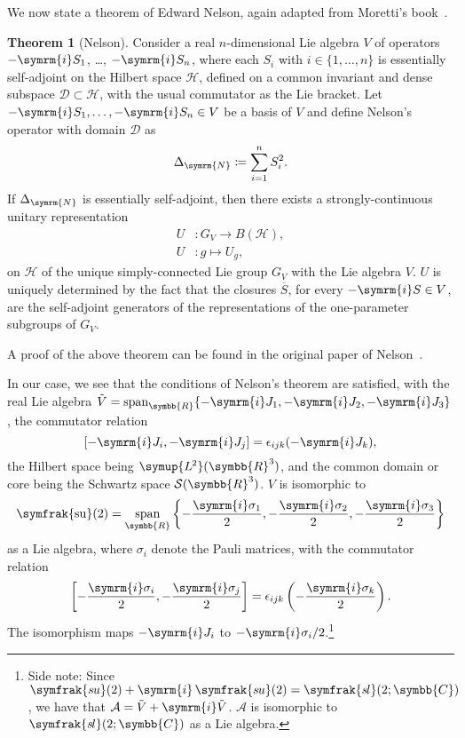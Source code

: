 \documentclass[12pt, a4 paper]{article}
\let\symcal\mathcal
\theoremstyle{definition}
\newtheorem{thm}{Theorem}
\newcommand{\ltwo}{\symup{L\kern-0.5pt^2}}
\newcommand{\ltworthree}{\ltwo(\rr^3)}
\newcommand{\rr}{\symbb{R}}
\newcommand{\cc}{\symbb{C}}
\newcommand{\hilbert}{\symcal{H}}
\newcommand{\schwartz}{\symcal{S}}
\newcommand{\schwartzrthree}{\schwartz(\rr^3)}
\renewcommand{\i}{\symrm{i}}
\newcommand{\domain}{\symcal{D}}
\DeclareMathOperator{\spann}{span}
\newcommand{\sutwo}{\operatorname{\symfrak{su}}(2)}
\begin{document}
    We now state a theorem of Edward Nelson, again adapted from Moretti's book~\cite[p.~291]{MorettiFundamental}.
    \begin{thm}[Nelson]
        Consider a real \(n\)-dimensional Lie algebra \(V\) of operators \(-\i S_1\), \ldots, \(-\i S_n\), where each \(S_i\) with \(i \in \{1, \ldots, n\}\) is essentially self-adjoint on the Hilbert space \(\hilbert\), defined on a common invariant and dense subspace \(\domain \subset \hilbert\), with the usual commutator as the Lie bracket.
        Let \(-\i S_1, \ldots, -\i S_n \in V\) be a basis of \(V\) and define Nelson's operator with domain \(\domain\) as
        \[
            \Delta_{\symrm{N}} \coloneq \sum_{i=1}^{n} S_i^2.
        \]
        If \(\Delta_{\symrm{N}}\) is essentially self-adjoint, then there exists a strongly-continuous unitary representation
        \begin{align*}
            U &\colon G_V \rightarrow B(\hilbert),\\
            U &\colon g \mapsto U_g,
        \end{align*}
        on \(\hilbert\) of the unique simply-connected Lie group \(G_V\) with the Lie algebra \(V\).
        \(U\) is uniquely determined by the fact that the closures \(\overline{S}\), for every \(-\i S \in V\), are the self-adjoint generators of the representations of the one-parameter subgroups of \(G_V\).
    \end{thm}
    A proof of the above theorem can be found in the original paper of Nelson~\cite{Nelson}.

    In our case, we see that the conditions of Nelson's theorem are satisfied, with the real Lie algebra \(\tilde{V} = \spann_{\rr}\{-\i J_1, -\i J_2, -\i J_3\}\), the commutator relation \[[-\i J_i, -\i J_j] = \epsilon_{ijk}(-\i J_k),\] the Hilbert space being \(\ltworthree\), and the common domain or core  being the Schwartz space \(\schwartzrthree\). \(V\) is isomorphic to \[\displaystyle\sutwo = \spann_{\rr}\left\{-\frac{\i\sigma_1}{2}, -\frac{\i\sigma_2}{2}, -\frac{\i\sigma_3}{2}\right\}\] as a Lie algebra, where \(\sigma_i\) denote the Pauli matrices, with the commutator relation \[\displaystyle\left[-\frac{\i\sigma_i}{2}, -\frac{\i\sigma_j}{2}\right] = \epsilon_{ijk}\left(-\frac{\i\sigma_k}{2}\right).\] The isomorphism maps \(-\i J_i\) to \(-\i \sigma_i/2\).\footnote{Side note: Since \(\symfrak{s\kern-0.6ptu}(2) + \i\,\symfrak{s\kern-0.6ptu}(2) = \symfrak{s\kern-0.8ptl}(2;\cc)\), we have that \(\symcal{A} = \tilde{V} + \i \tilde{V}\). \(\symcal{A}\) is isomorphic to \(\symfrak{s\kern-0.8ptl}(2;\cc)\) as a Lie algebra.}
\end{document}
